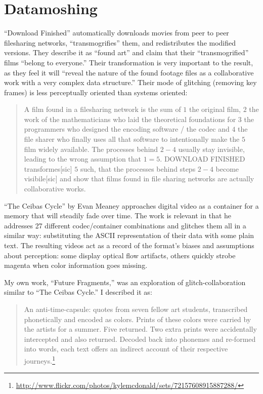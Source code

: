 \documentclass{thesis}
\begin{document}
\section{Datamoshing}
	\cite{!mediengruppe_bitnik_and_sven_knig_download_????}
	``Download Finished'' automatically downloads movies from peer to peer filesharing networks, ``transmogrifies'' them, and redistributes the modified versions. They describe it as ``found art'' and claim that their ``transmogrified'' films ``belong to everyone.'' Their transformation is very important to the result, as they feel it will ``reveal the nature of the found footage files as a collaborative work with a very complex data structure.'' Their mode of glitching (removing key frames) is less perceptually oriented than systems oriented:
	
	\begin{quote}
	A film found in a filesharing network is the sum of $1$ the original film, $2$ the work of the mathematicians who laid the theoretical foundations for $3$ the programmers who designed the encoding software / the codec and $4$ the file sharer who finally uses all that software to intentionally make the $5$ film widely available. The processes behind $2-4$ usually stay invisible, leading to the wrong assumption that $1=5$. DOWNLOAD FINISHED transformes[sic] $5$ such, that the processes behind steps $2-4$ become visibile[sic] and show that films found in file sharing networks are actually collaborative works.
	\end{quote}
	
	\cite{evan_meaney_ceibas:_2008}
	``The Ceibas Cycle'' by Evan Meaney approaches digital video as a container for a memory that will steadily fade over time. The work is relevant in that he addresses 27 different codec/container combinations and glitches them all in a similar way: substituting the ASCII representation of their data with some plain text. The resulting videos act as a record of the format's biases and assumptions about perception: some display optical flow artifacts, others quickly strobe magenta when color information goes missing.
	
	My own work, ``Future Fragments,'' was an exploration of glitch-collaboration similar to ``The Ceibas Cycle.'' I described it as:
	
	\begin{quote}
	An anti-time-capsule: quotes from seven fellow art students, transcribed phonetically and encoded as colors. Prints of these colors were carried by the artists for a summer. Five returned. Two extra prints were accidentally intercepted and also returned. Decoded back into phonemes and re-formed into words, each text offers an indirect account of their respective journeys.\footnote{\url{http://www.flickr.com/photos/kylemcdonald/sets/72157608915887288/}}
	\end{quote}
	
\end{document}

